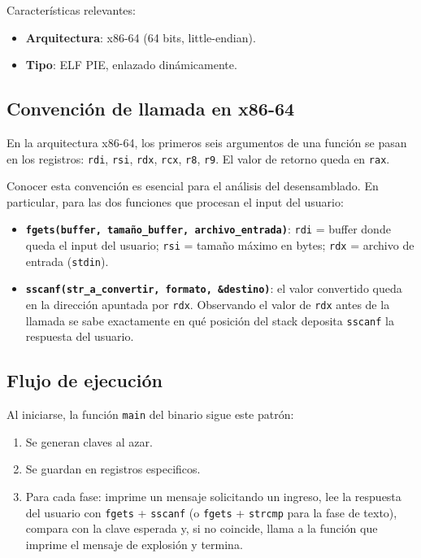 \documentclass[10pt,a4paper]{article}
\begin{document}
Características relevantes:
\begin{itemize}
    \item \textbf{Arquitectura}: x86-64 (64 bits, little-endian).
    \item \textbf{Tipo}: ELF PIE, enlazado dinámicamente.
\end{itemize}

\subsection{Convención de llamada en x86-64}

En la arquitectura x86-64, los primeros seis argumentos de una función se pasan en los registros: \texttt{rdi}, \texttt{rsi}, \texttt{rdx}, \texttt{rcx}, \texttt{r8}, \texttt{r9}. El valor de retorno queda en \texttt{rax}.

Conocer esta convención es esencial para el análisis del desensamblado. En particular, para las dos funciones que procesan el input del usuario:

\begin{itemize}
    \item \textbf{\texttt{fgets(buffer, tamaño\_buffer, archivo\_entrada)}}: \texttt{rdi} = buffer donde queda el input del usuario; \texttt{rsi} = tamaño máximo en bytes; \texttt{rdx} = archivo de entrada (\texttt{stdin}).
    \item \textbf{\texttt{sscanf(str\_a\_convertir, formato, \&destino)}}: el valor convertido queda en la dirección apuntada por \texttt{rdx}. Observando el valor de \texttt{rdx} antes de la llamada se sabe exactamente en qué posición del stack deposita \texttt{sscanf} la respuesta del usuario.
\end{itemize}

\subsection{Flujo de ejecución}

Al iniciarse, la función \texttt{main} del binario sigue este patrón:
\begin{enumerate}[label=\arabic*.]
    \item Se generan claves al azar.
    \item Se guardan en registros especificos.
    \item Para cada fase: imprime un mensaje solicitando un ingreso, lee la respuesta del usuario con \texttt{fgets} + \texttt{sscanf} (o \texttt{fgets} + \texttt{strcmp} para la fase de texto), compara con la clave esperada y, si no coincide, llama a la función que imprime el mensaje de explosión y termina.
\end{enumerate}
\end{document}
